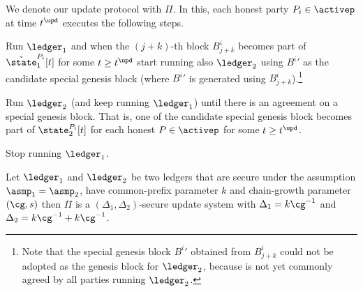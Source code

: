 We denote our update protocol with $\Pi$. In this, each honest party $P_i\in\activep$ at time $t^\upd$ executes the following steps.

\begin{myenumerate}
	\item Run $\ledger_1$ and when the $(j+k)$-th block $B^i_{j+k}$ becomes part of $\check \state_1^{P_i}[t]$ for some $t\geq t^\upd$
	start running also $\ledger_2$ using ${B^i}'$ as the candidate special genesis block (where ${B^i}'$ is generated using $B^i_{j+k}$).\footnote{Note that
	the special genesis block ${B^i}'$ obtained from $B^i_{j+k}$ could not be adopted as the genesis block for $\ledger_2$, because is not yet commonly agreed by all parties running $\ledger_2$.}
	\item Run $\ledger_2$ (and keep running $\ledger_1$) until there is an agreement on a special genesis block. That is, one of the candidate special genesis block 
	becomes part of $\state_2^{P_i}[t]$ for each honest $P\in\activep$ for some $t\geq t^\upd$.
	\item Stop running $\ledger_1$.
\end{myenumerate}



\begin{theorem}\label{th:main}
Let $\ledger_1$ and $\ledger_2$ be two ledgers that are secure under the assumption $\asmp_1=\asmp_2$, have common-prefix parameter $k$ and chain-growth parameter $(\cg, s)$ then
 $\Pi$ is a $(\Delta_1,\Delta_2)$-secure update system with $\Delta_1=k\cg^{-1}$ and $\Delta_2=k \cg^{-1} + k \cg^{-1}$.
\end{theorem}

